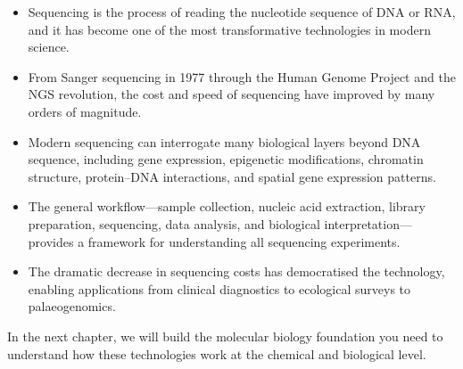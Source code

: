 \begin{itemize}[itemsep=2pt]
  \item Sequencing is the process of reading the nucleotide sequence of DNA or RNA, and it has become one of the most transformative technologies in modern science.
  \item From Sanger sequencing in 1977 through the Human Genome Project and the \acrshort{NGS} revolution, the cost and speed of sequencing have improved by many orders of magnitude.
  \item Modern sequencing can interrogate many biological layers beyond DNA sequence, including gene expression, epigenetic modifications, chromatin structure, protein--DNA interactions, and spatial gene expression patterns.
  \item The general workflow---sample collection, nucleic acid extraction, library preparation, sequencing, data analysis, and biological interpretation---provides a framework for understanding all sequencing experiments.
  \item The dramatic decrease in sequencing costs has democratised the technology, enabling applications from clinical diagnostics to ecological surveys to palaeogenomics.
\end{itemize}

In the next chapter, we will build the molecular biology foundation you need to understand how these technologies work at the chemical and biological level.
